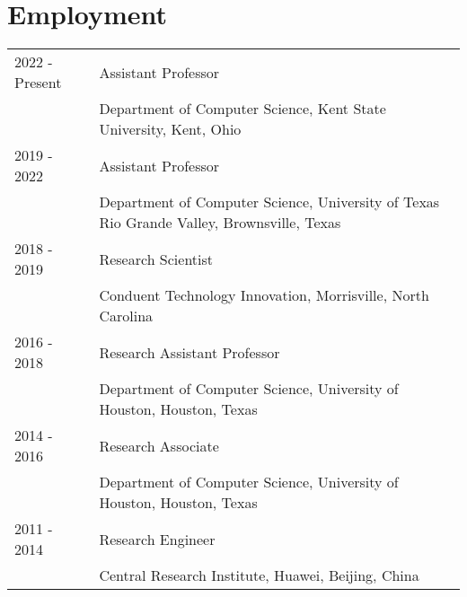 \section*{Employment}
\begin{longtable}{p{1in}p{5in}}

    2022 - Present  &   Assistant Professor\\
                    &   Department of Computer Science, Kent State University, Kent, Ohio\\
                    
    2019 - 2022	&	Assistant Professor\\
                    &   Department of Computer Science, University of Texas Rio Grande Valley, Brownsville, Texas\\ 

    2018 - 2019		&Research Scientist\\
                    &Conduent Technology Innovation, Morrisville, North Carolina\\

    2016 - 2018		&Research Assistant Professor\\
                    &Department of Computer Science, University of Houston, Houston, Texas\\

    2014 - 2016		&Research Associate\\
                    &Department of Computer Science, University of Houston, Houston, Texas\\

    2011 - 2014		&Research Engineer\\
                    &Central Research Institute, Huawei, Beijing, China\\
\end{longtable}









